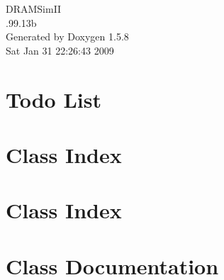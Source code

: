 \documentclass[a4paper]{book}
\begin{document}
\begin{titlepage}
\vspace*{7cm}
\begin{center}
{\Large DRAMSimII \\[1ex]\large .99.13b }\\
\vspace*{1cm}
{\large Generated by Doxygen 1.5.8}\\
\vspace*{0.5cm}
{\small Sat Jan 31 22:26:43 2009}\\
\end{center}
\end{titlepage}
\clearemptydoublepage
{}
\tableofcontents
\clearemptydoublepage
{}
\chapter{Todo List}
\label{todo}

\chapter{Class Index}

\chapter{Class Index}

\chapter{Class Documentation}























\printindex
\end{document}
